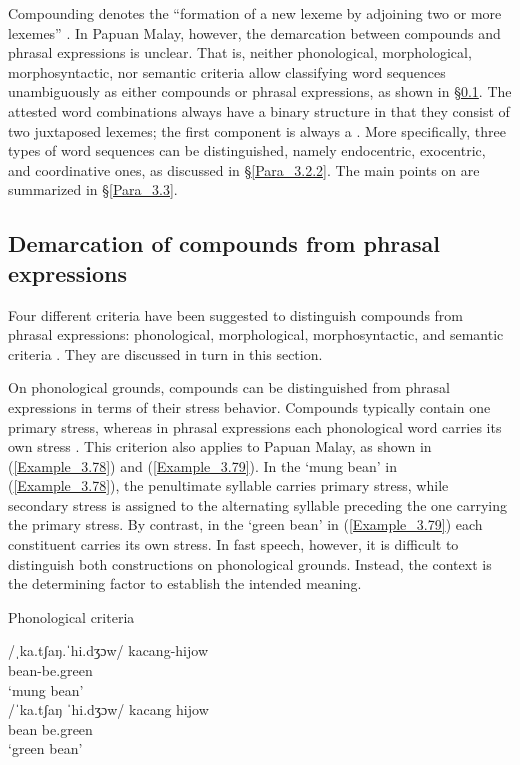 Compounding denotes the “formation of a new lexeme by adjoining two or more lexemes” \citep[40]{Bauer.2003}. In Papuan Malay, however, the demarcation between compounds and phrasal expressions is unclear. That is, neither phonological, morphological, morphosyntactic, nor semantic criteria allow classifying word sequences unambiguously as either compounds or phrasal expressions, as shown in §\ref{Para_3.2.1}. The attested word combinations always have a binary structure in that they consist of two juxtaposed lexemes; the first component is always a . More specifically, three types of word sequences can be distinguished, namely endocentric, exocentric, and coordinative ones, as discussed in §\ref{Para_3.2.2}. The main points on  are summarized in §\ref{Para_3.3}.
 

\subsection{Demarcation of compounds from phrasal expressions}\label{Para_3.2.1}

Four different criteria have been suggested to distinguish compounds from phrasal expressions: phonological, morphological, morphosyntactic, and semantic criteria {\citep[24]{Aikhenvald.2007}}. They are discussed in turn in this section.



On phonological grounds, compounds can be distinguished from phrasal expressions in terms of their stress behavior. Compounds typically contain one primary stress, where\-as in phrasal expressions each phonological word carries its own stress {\citep[25]{Aikhenvald.2007}}. This criterion also applies to Papuan Malay, as shown in (\ref{Example_3.78}) and (\ref{Example_3.79}). In the   ‘mung bean’ in (\ref{Example_3.78}), the penultimate syllable carries primary stress, while secondary stress is assigned to the alternating syllable preceding the one carrying the primary stress. By contrast, in the   ‘green bean’ in (\ref{Example_3.79}) each constituent carries its own stress. In fast speech, however, it is difficult to distinguish both constructions on phonological grounds. Instead, the context is the determining factor to establish the intended meaning.


\begin{styleExampleTitle}
{Phonological criteria}
\end{styleExampleTitle}
\ea
\label{Example_3.78}
\glll \textup{/ˌka.tʃaŋ.ˈhi.dʒɔw/} {} kacang-hijow\\ %
 { } { }  {bean-be.green}  \\
  { } { }  {‘mung bean’} \\
\z
\ea
\label{Example_3.79}
\glll \textup{/ˈka.tʃaŋ ˈhi.dʒɔw/} {}  kacang hijow\\ %
{} { }  {bean}  {be.green}  \\
{} { }  {‘green} {bean’} \\
\z


